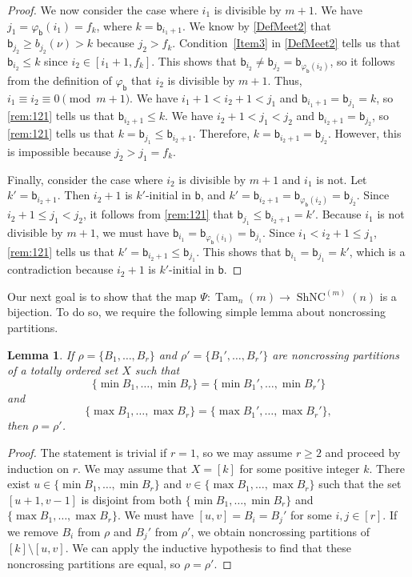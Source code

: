 \documentclass[11pt]{amsart}
\newtheorem{lemma}[theorem]{Lemma}
\theoremstyle{definition}
\DeclareMathOperator{\ShNC}{ShNC}
\DeclareMathOperator{\Tam}{Tam}
\begin{document}
\begin{proof}
We now consider the case where $i_1$ is divisible by $m+1$. We have $j_1=\varphi_{\mathsf b}(i_1)=f_k$, where $k=\mathsf b_{i_1+1}$. We know by \cref{DefMeet2} that $\mathsf b_{j_2}\geq b_{j_2}(\nu)>k$ because $j_2>f_k$. Condition~\eqref{Item3} in \cref{DefMeet2} tells us that $\mathsf b_{i_2}\leq k$ since $i_2\in[i_1+1,f_k]$. This shows that $\mathsf b_{i_2}\neq\mathsf b_{j_2}=\mathsf b_{\varphi_{\mathsf b}(i_2)}$, so it follows from the definition of $\varphi_{\mathsf b}$ that $i_2$ is divisible by $m+1$. Thus, $i_1\equiv i_2\equiv 0\pmod{m+1}$. We have $i_1+1<i_2+1<j_1$ and $\mathsf b_{i_1+1}=\mathsf b_{j_1}=k$, so \cref{rem:121} tells us that $\mathsf b_{i_2+1}\leq k$. We have $i_2+1<j_1<j_2$ and $\mathsf b_{i_2+1}=\mathsf b_{j_2}$, so \cref{rem:121} tells us that $k=\mathsf b_{j_1}\leq\mathsf b_{i_2+1}$. Therefore, $k=\mathsf b_{i_2+1}=\mathsf b_{j_2}$. However, this is impossible because $j_2>j_1=f_k$. 

Finally, consider the case where $i_2$ is divisible by $m+1$ and $i_1$ is not. Let $k'=\mathsf b_{i_2+1}$. Then $i_2+1$ is $k'$-initial in $\mathsf b$, and $k'=\mathsf b_{i_2+1}=\mathsf b_{\varphi_{\mathsf b}(i_2)}=\mathsf b_{j_2}$. Since $i_2+1\leq j_1<j_2$, it follows from \cref{rem:121} that $\mathsf b_{j_1}\leq\mathsf b_{i_2+1}=k'$. Because $i_1$ is not divisible by $m+1$, we must have $\mathsf b_{i_1}=\mathsf b_{\varphi_{\mathsf b}(i_1)}=\mathsf b_{j_1}$. Since $i_1<i_2+1\leq j_1$, \cref{rem:121} tells us that $k'=\mathsf b_{i_2+1}\leq\mathsf b_{j_1}$. This shows that $\mathsf b_{i_1}=\mathsf b_{j_1}=k'$, which is a contradiction because $i_2+1$ is $k'$-initial in $\mathsf b$.
\end{proof}

Our next goal is to show that the map $\Psi\colon\Tam_n(m)\to\ShNC^{(m)}(n)$ is a bijection. To do so, we require the following simple lemma about noncrossing partitions.

\begin{lemma}\label{lem:uniqueNC}
If $\rho=\{B_1,\ldots,B_r\}$ and $\rho'=\{B_1',\ldots,B_r'\}$ are noncrossing partitions of a totally ordered set $X$ such that \[\{\min B_1,\ldots,\min B_r\}=\{\min B_1',\ldots,\min B_r'\}\] 
 and \[\{\max B_1,\ldots,\max B_r\}=\{\max B_1',\ldots,\max B_r'\},\] then $\rho=\rho'$. 
\end{lemma}

\begin{proof}
The statement is trivial if $r=1$, so we may assume $r\geq 2$ and proceed by induction on $r$. We may assume that $X=[k]$ for some positive integer $k$. There exist $u\in\{\min B_1,\ldots,\min B_r\}$ and $v\in\{\max B_1,\ldots,\max B_r\}$ such that the set $[u+1,v-1]$ is disjoint from both $\{\min B_1,\ldots,\min B_r\}$ and $\{\max B_1,\ldots,\max B_r\}$. We must have $[u,v]=B_i=B_j'$ for some $i,j\in[r]$. If we remove $B_i$ from $\rho$ and $B_j'$ from $\rho'$, we obtain noncrossing partitions of $[k]\setminus[u,v]$. We can apply the inductive hypothesis to find that these noncrossing partitions are equal, so $\rho=\rho'$.       
\end{proof}
\end{document}
